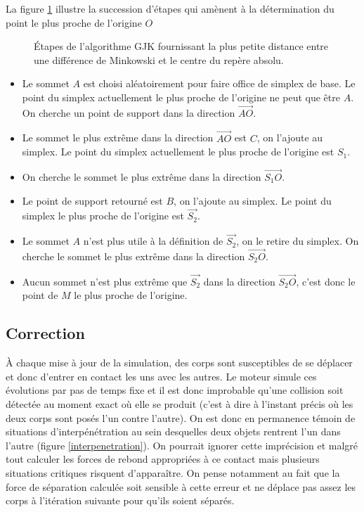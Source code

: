 La figure \ref{gjk} illustre la succession d'étapes qui amènent à la
détermination du point le plus proche de l'origine $O$

\begin{figure}[h]
  \centering
  \subfloat[]{  }
  \subfloat[]{  }
  \qquad
  \subfloat[]{  }
  \subfloat[]{  }
  \qquad
  \subfloat[]{  }
  \subfloat[]{  }
  \caption{{\'E}tapes de l'algorithme GJK fournissant la plus petite
    distance entre une différence de Minkowski et le centre du repère
    absolu.}
  \label{gjk}
\end{figure}

\begin{itemize}
\item Le sommet $A$ est choisi aléatoirement pour faire office de
  simplex de base. Le point du simplex actuellement le plus proche de
  l'origine ne peut que être $A$. On cherche un point de support dans
  la direction $\vec{AO}$.
\item Le sommet le plus extrême dans la direction $\vec{AO}$ est $C$,
  on l'ajoute au simplex. Le point du simplex actuellement le plus
  proche de l'origine est $S_1$.
\item On cherche le sommet le plus extrême dans la direction
  $\vec{S_1O}$.
\item Le point de support retourné est $B$, on l'ajoute au simplex. Le
  point du simplex le plus proche de l'origine est $\vec{S_2}$.
\item Le sommet $A$ n'est plus utile à la définition de $\vec{S_2}$,
  on le retire du simplex. On cherche le sommet le plus extrême dans
  la direction $\vec{S_2O}$.
\item Aucun sommet n'est plus extrême que $\vec{S_2}$ dans la
  direction $\vec{S_2O}$, c'est donc le point de $M$ le plus proche de
  l'origine.
\end{itemize}

\subsection{Correction}

\`A chaque mise à jour de la simulation, des corps sont susceptibles
de se déplacer et donc d'entrer en contact les uns avec les autres. Le
moteur simule ces évolutions par pas de temps fixe et il est donc
improbable qu'une collision soit détectée au moment exact o\`u elle se
produit (c'est à dire à l'instant précis o\`u les deux corps sont
posés l'un contre l'autre). On est donc en permanence témoin de
situations d'interpénétration au sein desquelles deux objets rentrent
l'un dans l'autre (figure \ref{interpenetration}).  On pourrait
ignorer cette imprécision et malgré tout calculer les forces de rebond
appropriées à ce contact mais plusieurs situations critiques risquent
d'apparaître. On pense notamment au fait que la force de séparation
calculée soit sensible à cette erreur et ne déplace pas assez les
corps à l'itération suivante pour qu'ils soient séparés.

